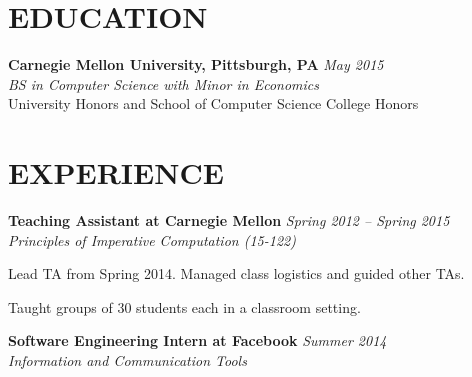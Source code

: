 \documentclass[margin, 11pt]{res} %
\begin{document}
\begin{resume}


\section{EDUCATION}

{\bf Carnegie Mellon University, Pittsburgh, PA} \hfill {\sl May 2015}\\
{\sl BS in Computer Science with Minor in Economics } \\
{\small University Honors and School of Computer Science College Honors}



\section{EXPERIENCE}

{\bf Teaching Assistant at Carnegie Mellon} \hfill {\sl Spring 2012 -- Spring 2015}\\
{\sl Principles of Imperative Computation (15-122)}

\begin{itemize} \itemsep -2pt
{\small \item Lead TA from Spring 2014. Managed class logistics and guided other TAs.
\item Taught groups of 30 students each in a classroom setting.}
\end{itemize}

\vspace{3pt}

{\bf Software Engineering Intern at Facebook} \hfill {\sl Summer 2014}\\
{\sl Information and Communication Tools}


\end{resume}
\end{document}
